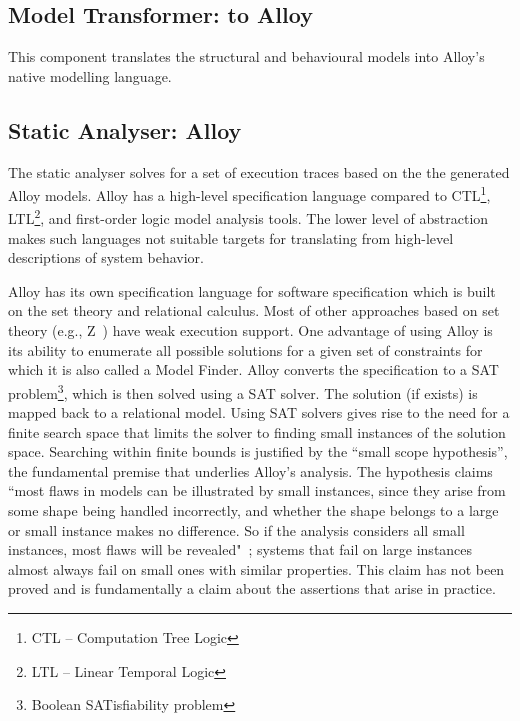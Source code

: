 \subsection{Model Transformer: to Alloy}
\label{sec:framework-overview-model-transformer}
This component translates the structural and behavioural models into Alloy's native modelling language.


\subsection{Static Analyser: Alloy}
\label{sec:framework-overview-static-analyser}
The static analyser solves for a set of execution traces based on the the generated Alloy models. Alloy has a high-level specification language compared to CTL\footnote{CTL – Computation Tree Logic}, LTL\footnote{LTL – Linear Temporal Logic}, and first-order logic model analysis tools. The lower level of abstraction makes such languages not suitable targets for translating from high-level descriptions of system behavior.

Alloy has its own specification language for software specification which is built on the set theory and relational calculus. Most of  other approaches based on set theory (e.g., Z~\cite{Spivey1992}) have weak execution support. One advantage of using Alloy is its ability to enumerate all possible solutions for a given set of constraints for which it is also called a Model Finder. Alloy converts the specification to a SAT problem\footnote{Boolean SATisfiability problem}, which is then solved using a SAT solver. The solution (if exists) is mapped back to a relational model. Using SAT solvers gives rise to the need for a finite search space that limits the solver to finding small instances of the solution space.
Searching within finite bounds is justified by the ``small scope hypothesis'', the fundamental premise that underlies Alloy’s analysis. The hypothesis claims ``most flaws in models can be illustrated by small instances, since they arise from some shape being handled incorrectly, and whether the shape belongs to a large or small instance makes no difference. So if the analysis considers all small instances, most flaws will be revealed"~\cite{Jackson2012}; systems that fail on large instances
almost always fail on small ones with similar properties.
This claim has not been proved and is fundamentally a claim about the assertions that arise in practice. %


